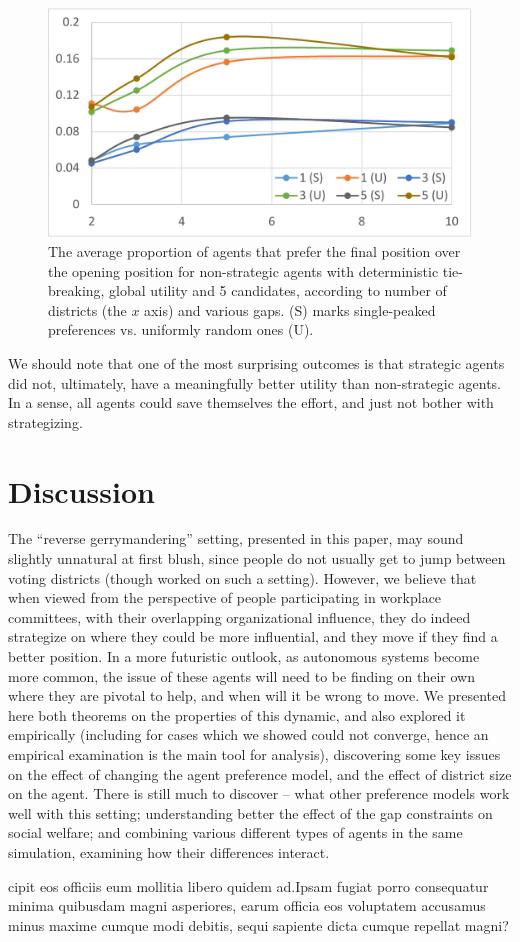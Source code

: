 \documentclass[letterpaper]{article} %
\begin{document}
\begin{figure}
	\centering
	\includegraphics[width=\columnwidth]{by_gap_by_sp_rev_stats_agent_util_imp_v_53_tb_True_st_False_gr_True_can_5_N_1000_new.pdf}
	\caption{The average proportion of agents that prefer the final position over the opening position
		 for non-strategic agents with deterministic tie-breaking, global utility and 5 candidates, according to number of districts (the $x$ axis) and various gaps. (S) marks single-peaked preferences vs. uniformly random ones (U).}
	\label{fig:SPGlob}
\end{figure}

We should note that one of the most surprising outcomes is that strategic agents did not, ultimately, have a meaningfully better utility than non-strategic agents. In a sense, all agents could save themselves the effort, and just not bother with strategizing.

\section{Discussion}

The ``reverse gerrymandering'' setting, presented in this paper, may sound slightly unnatural at first blush, since people do not usually get to jump between voting districts (though \cite{BM12} worked on such a setting). However, we believe that when viewed from the perspective of people participating in workplace committees, with their overlapping organizational influence, they do indeed strategize on where they could be more influential, and they move if they find a better position. In a more futuristic outlook, as autonomous systems become more common, the issue of these agents will need to be finding on their own where they are pivotal to help, and when will it be wrong to move.
We presented here both theorems on the properties of this dynamic, and also explored it empirically (including for cases which we showed could not converge, hence an empirical examination is the main tool for analysis), discovering some key issues on the effect of changing the agent preference model, and the effect of district size on the agent. There is still much to discover -- what other preference models work well with this setting; understanding better the effect of the gap constraints on social welfare; and combining various different types of agents in the same simulation, examining how their differences interact.


cipit eos officiis eum mollitia libero quidem ad.Ipsam fugiat porro consequatur minima quibusdam magni asperiores, earum officia eos voluptatem accusamus minus maxime cumque modi debitis, sequi sapiente dicta cumque repellat magni?\clearpage


\end{document}
